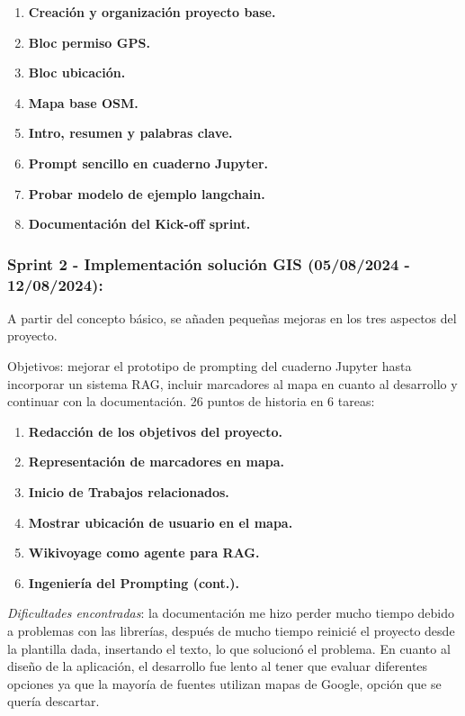     \begin{enumerate}
    	\item \textbf{Creación y organización proyecto base.}
    	\item \textbf{Bloc permiso GPS.}
    	\item \textbf{Bloc ubicación.}
    	\item \textbf{Mapa base OSM.}
    	\item \textbf{Intro, resumen y palabras clave.}
    	\item \textbf{Prompt sencillo en cuaderno Jupyter.}
    	\item \textbf{Probar modelo de ejemplo \gls{langchain}.}
    	\item \textbf{Documentación del Kick-off sprint.}
    \end{enumerate}


\subsubsection{Sprint 2 - Implementación solución GIS (05/08/2024 - 12/08/2024):} 
A partir del concepto básico, se añaden pequeñas mejoras en los tres aspectos del proyecto.

    Objetivos: mejorar el prototipo de prompting del cuaderno Jupyter hasta incorporar un sistema RAG, incluir marcadores al mapa en cuanto al desarrollo y continuar con la documentación. 26 puntos de historia en 6 tareas:

	\begin{enumerate}
		\item \textbf{Redacción de los objetivos del proyecto.}
		\item \textbf{Representación de marcadores en mapa.}
		\item \textbf{Inicio de Trabajos relacionados.}
		\item \textbf{Mostrar ubicación de usuario en el mapa.}
		\item \textbf{Wikivoyage como agente para RAG.}
		\item \textbf{Ingeniería del Prompting (cont.).}
	\end{enumerate}


    \textit{Dificultades encontradas}: la documentación me hizo perder mucho tiempo debido a problemas con las librerías, después de mucho tiempo reinicié el proyecto desde la plantilla dada, insertando el texto, lo que solucionó el problema. En cuanto al diseño de la aplicación, el desarrollo fue lento al tener que evaluar diferentes opciones ya que la mayoría de fuentes utilizan mapas de Google, opción que se quería descartar.


